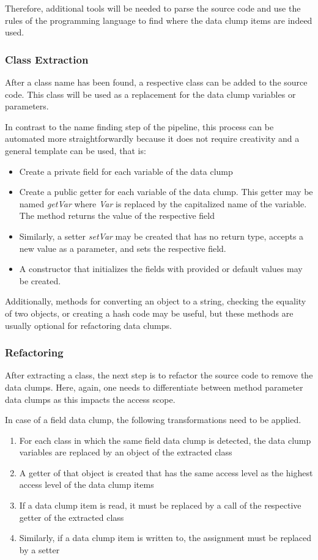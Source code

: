 Therefore, additional tools will be needed to parse the source code and use the rules of the programming language to find where the data clump items are indeed used.
\subsubsection{Class Extraction}\label{subsec:chap3_data_class_extraction}
After a class name has been found, a respective class can be added to the source code. This class will be used as a replacement for the data clump variables or parameters. 

In contrast to the name finding step of the pipeline, this process can be automated more straightforwardly because it does not require creativity and a general template can be used, that is:
\begin{itemize}
    \item Create a private field for each variable of the data clump
    \item Create a public getter for each variable of the data clump. This getter may be named \textit{getVar} where \textit{Var} is replaced by the capitalized name of the variable. The method returns the value of the respective field
    \item Similarly, a setter \textit{setVar} may be created that has no return type, accepts a new value as a parameter, and sets the respective field. 
    \item A constructor that initializes the fields with provided or default values may be created. 
\end{itemize}

Additionally, methods for converting an object to a string, checking the equality of two objects, or creating a hash code may be useful, but these methods are usually optional for refactoring data clumps. 


\subsubsection{Refactoring}
After extracting a class, the next step is to refactor the source code to remove the data clumps. Here, again, one needs to differentiate between method parameter data clumps as this impacts the access scope. 

In case of a field data clump, the following transformations need to be applied.

\begin{enumerate}
    \item For each class in which the same field data clump is detected, the data clump variables are replaced by an object of the extracted class
    \item A getter of that object is created that has the same access level as the highest access level of the data clump items
    \item If a data clump item is read, it must be replaced by a call of the respective getter of the extracted class
    \item Similarly, if a data clump item is written to, the assignment must be replaced by a setter
\end{enumerate}



